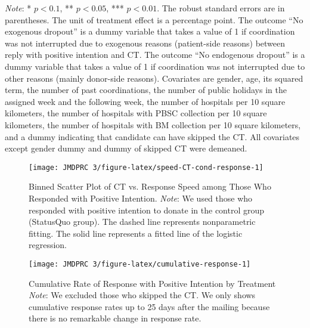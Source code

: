 \documentclass[12pt, a4paper]{article}
\begin{document}
\begin{table}[H]
\begin{threeparttable}
\begin{tablenotes}
\item \emph{Note}: * $p < 0.1$, ** $p < 0.05$, *** $p < 0.01$. The robust standard errors are in parentheses. The unit of treatment effect is a percentage point. The outcome ``No exogenous dropout'' is a dummy variable that takes a value of 1 if coordination was not interrupted due to exogenous reasons (patient-side reasons) between reply with positive intention and CT. The outcome ``No endogenous dropout'' is a dummy variable that takes a value of 1 if coordination was not interrupted due to other reasons (mainly donor-side reasons). Covariates are gender, age, its squared term, the number of past coordinations, the number of public holidays in the assigned week and the following week, the number of hospitals per 10 square kilometers, the number of hospitals with PBSC collection per 10 square kilometers, the number of hospitals with BM collection per 10 square kilometers, and a dummy indicating that candidate can have skipped the CT. All covariates except gender dummy and dummy of skipped CT were demeaned.
\end{tablenotes}
\end{threeparttable}
\end{table}

\begin{figure}[H]
\texttt{[image: JMDPRC~3/figure-latex/speed-CT-cond-response-1]} \caption{Binned Scatter Plot of CT vs. Response Speed among Those Who Responded with Positive Intention. \newline \emph{Note}: We used those who responded with positive intention to donate in the control group (StatusQuo group). The dashed line represents nonparametric fitting. The solid line represents a fitted line of the logistic regression.}\label{fig:speed-CT-cond-response}
\end{figure}

\begin{figure}[H]
\texttt{[image: JMDPRC~3/figure-latex/cumulative-response-1]} \caption{Cumulative Rate of Response with Positive Intention by Treatment \newline \emph{Note}: We excluded those who skipped the CT. We only shows cumulative response rates up to 25 days after the mailing because there is no remarkable change in response rate.}\label{fig:cumulative-response}
\end{figure}

\clearpage
\end{document}
